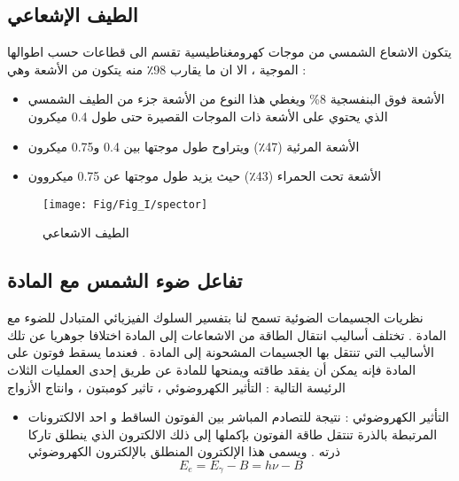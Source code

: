 \subsection{الطيف الإشعاعي}
يتكون الاشعاع الشمسي من موجات كهرومغناطيسية تقسم الى قطاعات حسب اطوالها الموجية ، الا ان ما يقارب 98٪ منه يتكون من الأشعة وهي :
\begin{itemize} 
	\item  الأشعة فوق البنفسجية 8\% ويغطي هذا النوع من الأشعة جزء من الطيف الشمسي الذي يحتوي على الأشعة ذات الموجات القصيرة حتى طول 0.4 ميكرون 
	\item الأشعة المرئية (47٪) ويتراوح طول موجتها بين 0.4 و0.75 ميكرون 
	\item الأشعة تحت الحمراء (43٪) حيث يزيد طول موجتها عن 0.75         ميكروون  \cite{a2}
\end{itemize}
\begin{figure}[h!]
	\centering
	\texttt{[image: Fig/Fig\_I/spector]}
	\caption{الطيف الاشعاعي}
	\label{fig:spector}
\end{figure}
\FloatBarrier
\subsection{ تفاعل ضوء الشمس مع المادة }
نظريات الجسيمات الضوئية تسمح لنا بتفسير السلوك الفيزيائي المتبادل للضوء مع المادة .
تختلف أساليب انتقال الطاقة من الاشعاعات إلى المادة اختلافا جوهريا عن تلك الأساليب التي تنتقل بها الجسيمات المشحونة إلى المادة . فعندما يسقط فوتون على المادة فإنه يمكن أن يفقد طاقته ويمنحها للمادة عن طريق إحدى العمليات الثلاث الرئيسة التالية : التأثير الكهروضوئي ، تاثير كومبتون ، وانتاج الأزواج 
\begin{itemize} 
	\item التأثير الكهروضوئي : نتيجة للتصادم المباشر بين الفوتون الساقط و احد الالكترونات المرتبطة بالذرة تنتقل طاقة الفوتون بإكملها إلى ذلك الالكترون الذي ينطلق تاركا ذرته . ويسمى هذا الإلكترون المنطلق بالإلكترون الكهروضوئي
 \cite{a3}
	\begin {equation} 
	E_{e} = E_{\gamma} - B = h\nu -B
	\end {equation}
	\end {itemize}
